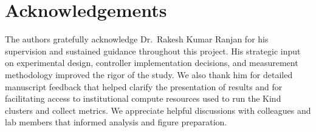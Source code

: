 \documentclass[twocolumn]{svjour3}
\begin{document}
\section*{Acknowledgements}
The authors gratefully acknowledge Dr.\ Rakesh Kumar Ranjan for his supervision and
sustained guidance throughout this project. His strategic input on experimental design,
controller implementation decisions, and measurement methodology improved the rigor of the
study. We also thank him for detailed manuscript feedback that helped clarify the presentation
of results and for facilitating access to institutional compute resources used to run the Kind
clusters and collect metrics. We appreciate helpful discussions with colleagues and lab members
that informed analysis and figure preparation.





\end{document}
